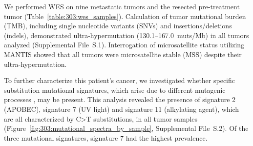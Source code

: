 We performed WES on nine metastatic tumors and the resected pre-treatment tumor (Table~\ref{table:303:wes_samples}). Calculation of tumor mutational burden (TMB), including single nucleotide variants (SNVs) and insertions/deletions (indels), demonstrated ultra-hypermutation (130.1--167.0~muts/Mb) in all tumors analyzed (Supplemental File~S\thechapter{}.1). Interrogation of microsatellite status utilizing MANTIS \cite{kautto17} showed that all tumors were microsatellite stable (MSS) despite their ultra-hypermutation. 

To further characterize this patient's cancer, we investigated whether specific substitution mutational signatures, which arise due to different mutagenic processes \cite{alexandrov2013}, may be present. This analysis revealed the presence of signature 2 (APOBEC), signature 7 (UV light) and signature 11 (alkylating agent), which are all characterized by C\textgreater{}T substitutions, in all tumor samples (Figure~\ref{fig:303:mutational_spectra_by_sample}, Supplemental File~S\thechapter{}.2). Of the three mutational signatures, signature 7 had the highest prevalence.

